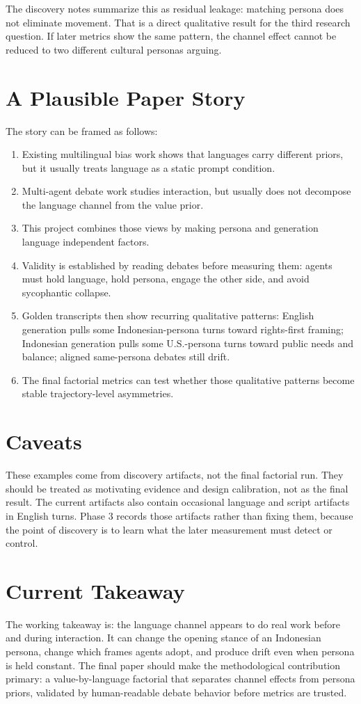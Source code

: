 \documentclass[11pt]{article}
\begin{document}
The discovery notes summarize this as residual leakage: matching persona does
not eliminate movement. That is a direct qualitative result for the third
research question. If later metrics show the same pattern, the channel effect
cannot be reduced to two different cultural personas arguing.

\section{A Plausible Paper Story}

The story can be framed as follows:

\begin{enumerate}[leftmargin=*]
  \item Existing multilingual bias work shows that languages carry different
  priors, but it usually treats language as a static prompt condition.
  \item Multi-agent debate work studies interaction, but usually does not
  decompose the language channel from the value prior.
  \item This project combines those views by making persona and generation
  language independent factors.
  \item Validity is established by reading debates before measuring them:
  agents must hold language, hold persona, engage the other side, and avoid
  sycophantic collapse.
  \item Golden transcripts then show recurring qualitative patterns:
  English generation pulls some Indonesian-persona turns toward rights-first
  framing; Indonesian generation pulls some U.S.-persona turns toward public
  needs and balance; aligned same-persona debates still drift.
  \item The final factorial metrics can test whether those qualitative
  patterns become stable trajectory-level asymmetries.
\end{enumerate}

\section{Caveats}

These examples come from discovery artifacts, not the final factorial run.
They should be treated as motivating evidence and design calibration, not as
the final result. The current artifacts also contain occasional language and
script artifacts in English turns. Phase 3 records those artifacts rather than
fixing them, because the point of discovery is to learn what the later
measurement must detect or control.

\section{Current Takeaway}

The working takeaway is: the language channel appears to do real work before
and during interaction. It can change the opening stance of an Indonesian
persona, change which frames agents adopt, and produce drift even when persona
is held constant. The final paper should make the methodological contribution
primary: a value-by-language factorial that separates channel effects from
persona priors, validated by human-readable debate behavior before metrics are
trusted.
\end{document}
